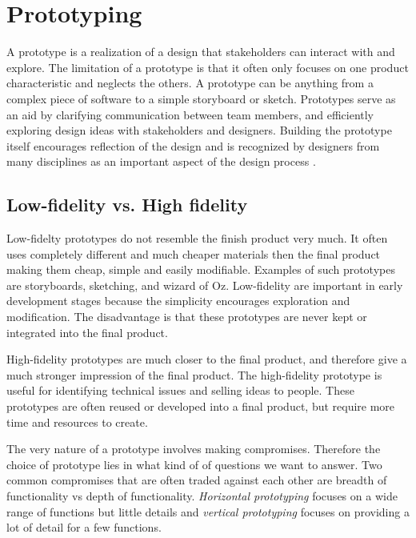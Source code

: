 \section{Prototyping}
A prototype is a realization of a design that stakeholders can interact with and explore. The limitation of a prototype is that it often only focuses on one product characteristic and neglects the others. A prototype can be anything from a complex piece of software to a simple storyboard or sketch. Prototypes serve as an aid by clarifying communication between team members, and efficiently exploring design ideas with stakeholders and designers. Building the prototype itself encourages reflection of the design and is recognized by designers from many disciplines as an important aspect of the design process \cite{interactionDesign}.

\subsection{Low-fidelity vs. High fidelity}
Low-fidelty prototypes do not resemble the finish product very much. It often uses completely different and much cheaper materials then the final product making them cheap, simple and easily modifiable. Examples of such prototypes are storyboards, sketching, and wizard of Oz. Low-fidelity are important in early development stages because the simplicity encourages exploration and modification. The disadvantage is that these prototypes are never kept or integrated into the final product.

High-fidelity prototypes are much closer to the final product, and therefore give a much stronger impression of the final product. The high-fidelity prototype is useful for identifying technical issues and selling ideas to people. These prototypes are often reused or developed into a final product, but require more time and resources to create.

The very nature of a prototype involves making compromises. Therefore the choice of prototype lies in what kind of of questions we want to answer. Two common compromises that are often traded against each other are breadth of functionality vs depth of functionality. \textit{Horizontal prototyping} focuses on a wide range of functions but little details and \textit{vertical prototyping} focuses on providing a lot of detail for a few functions. 

